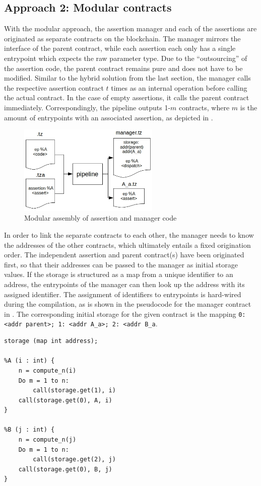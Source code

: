 \subsection{Approach 2: Modular contracts}\label{sec:modular}
With the modular approach, the assertion manager and each of the assertions are originated as separate contracts on the blockchain. The manager mirrors the interface of the parent contract, while each assertion each only has a single entrypoint which expects the raw parameter type. Due to the ``outsourcing'' of the assertion code, the parent contract remains pure and does not have to be modified. Similar to the hybrid solution from the last section, the manager calls the respective assertion contract $t$ times as an internal operation before calling the actual contract. In the case of empty assertions, it calls the parent contract immediately. Correspondingly, the pipeline outputs 1-$m$ contracts, where $m$ is the amount of entrypoints with an associated assertion, as depicted in .
\begin{figure}[h]
\centering
  \includegraphics[width=0.6\textwidth]{figures/4-offline_tezos/pipeline_output_modular.jpg}
	\caption{Modular assembly of assertion and manager code}
	\label{fig:modular_assembly}
\end{figure}

In order to link the separate contracts to each other, the manager needs to know the addresses of the other contracts, which ultimately entails a fixed origination order. The independent assertion and parent contract(s) have been originated first, so that their addresses can be passed to the manager as initial storage values. If the storage is structured as a map from a unique identifier to an address, the entrypoints of the manager can then look up the address with its assigned identifier. The assignment of identifiers to entrypoints is hard-wired during the compilation, as is shown in the pseudocode for the manager contract in . The corresponding initial storage for the given contract is the mapping \texttt{{0: <addr parent>; 1: <addr A\_a>; 2: <addr B\_a}}.
\begin{lstlisting}[label=lst:manager_modular, caption=Implementation of the modular manager in pseudocode]
storage (map int address);

%A (i : int) {
	n = compute_n(i)
	Do m = 1 to n:
		call(storage.get(1), i)
	call(storage.get(0), A, i)
}

%B (j : int) {
	n = compute_n(j)
	Do m = 1 to n:
		call(storage.get(2), j)
	call(storage.get(0), B, j)
}
\end{lstlisting}

